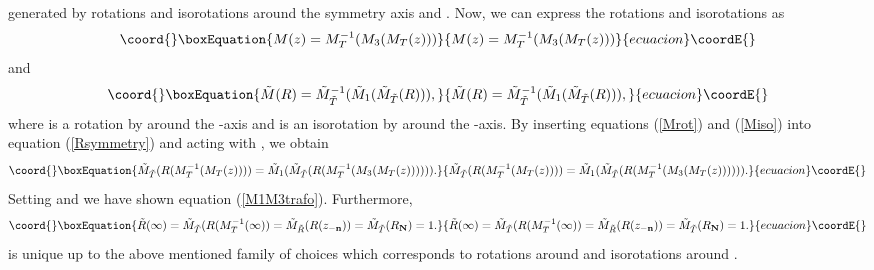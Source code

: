 \documentclass[a4paper,12pt]{article}
\begin{document}
generated by rotations and isorotations around the symmetry axis \coordHE{} and 
\coordHE{}. 
Now, we can express the rotations and isorotations as
%
\begin{equation}\coord{}\boxEquation{
\label{Mrot}
M(z) = M^{-1}_T(M_3(M_T(z)))
}{
M(z) = M^{-1}_T(M_3(M_T(z)))
}{ecuacion}\coordE{}\end{equation}
%
and
%
\begin{equation}\coord{}\boxEquation{
\label{Miso}
{\tilde M}(R) = {\tilde M}^{-1}_{{\tilde T}}({\tilde M}_1({\tilde 
M}_{{\tilde T}}(R))),
}{
{\tilde M}(R) = {\tilde M}^{-1}_{{\tilde T}}({\tilde M}_1({\tilde 
M}_{{\tilde T}}(R))),
}{ecuacion}\coordE{}\end{equation}
%
where \coordHE{} is a rotation by \myHighlight{$\alpha$}\coordHE{} around the \coordHE{}-axis and \coordHE{} 
is an isorotation by \myHighlight{$\beta$}\coordHE{} around the \coordHE{}-axis.
By inserting equations (\ref{Mrot}) and (\ref{Miso}) into equation 
(\ref{Rsymmetry}) and acting with \coordHE{}, we obtain
%
\begin{equation}\coord{}\boxEquation{
{\tilde M}_{{\tilde T}}(R(M^{-1}_T (M_T(z))))
=
{\tilde M}_1({\tilde M}_{{\tilde T}}(R(M^{-1}_T(M_3(M_T(z)))))).
}{
{\tilde M}_{{\tilde T}}(R(M^{-1}_T (M_T(z))))
=
{\tilde M}_1({\tilde M}_{{\tilde T}}(R(M^{-1}_T(M_3(M_T(z)))))).
}{ecuacion}\coordE{}\end{equation}
%
Setting \coordHE{} and \coordHE{} we have shown equation 
(\ref{M1M3trafo}).
%
Furthermore,
\begin{equation}\coord{}\boxEquation{
{\tilde R}(\infty) = {\tilde M}_{{\tilde T}}(R(M^{-1}_T (\infty)) 
= {\tilde M}_{{\tilde R}}(R(z_{-{\bf n}})) 
= {\tilde M}_{{\tilde T}}(R_{{\bf N}}) = 1. 
}{
{\tilde R}(\infty) = {\tilde M}_{{\tilde T}}(R(M^{-1}_T (\infty)) 
= {\tilde M}_{{\tilde R}}(R(z_{-{\bf n}})) 
= {\tilde M}_{{\tilde T}}(R_{{\bf N}}) = 1. 
}{ecuacion}\coordE{}\end{equation}
%
\coordHE{} is unique up to the above mentioned \coordHE{} family 
of choices which corresponds to rotations around \coordHE{} and isorotations around 
\coordHE{}. \hfill \myHighlight{$\square$}\coordHE{} \\
\end{document}
